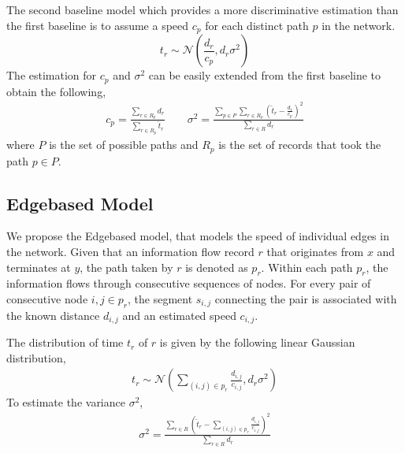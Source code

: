\documentclass{sig-alternate}
\begin{document}
The second baseline model which provides a more discriminative estimation than the first baseline is to assume a speed $c_p$ for each distinct path $p$ in the network.
\[ t_r \sim \mathcal{N} \left( \frac{d_r}{c_p}, d_r \sigma^2 \right) \]
The estimation for $c_p$ and $\sigma^2$ can be easily extended from the first baseline to obtain the following,
\begin{gather*}
	c_p = \frac{\sum_{r \in R_p} d_r}{\sum_{r \in R_p} \hat{t}_r} \qquad
    \sigma^2 = \frac{ \sum_{p \in P} \sum_{r \in R_p} \left( \hat{t}_r - \frac{d_r}{c_p} \right)^2 }{ \sum_{r \in R} d_r }
\end{gather*}
where $P$ is the set of possible paths and $R_p$ is the set of records that took the path $p \in P$.

\subsection{Edgebased Model}

We propose the Edgebased model, that models the speed of individual edges in the network. Given that an information flow record $r$ that originates from $x$ and terminates at $y$, the path taken by $r$ is denoted as $p_r$. Within each path $p_r$, the information flows through consecutive sequences of nodes. For every pair of consecutive node $i,j \in p_r$, the segment $s_{i,j}$ connecting the pair is associated with the known distance $d_{i,j}$ and an estimated speed $c_{i,j}$.

The distribution of time $t_r$ of $r$ is given by the following linear Gaussian distribution,
\begin{gather*}
	t_r \sim \mathcal{N} \left( \sum_{ (i,j) \in p_r } \frac{ d_{i,j} }{ c_{i,j} }, d_r \sigma^2 \right)
\end{gather*}
To estimate the variance $\sigma^2$,
\begin{align*}
	\sigma^2 = \frac{ \sum_{r \in R} \left( \hat{t}_r - \sum_{ (i,j) \in p_r } \frac{d_{i,j}}{c_{i,j}} \right)^2}{\sum_{r \in R} d_r}
\end{align*}
\end{document}
